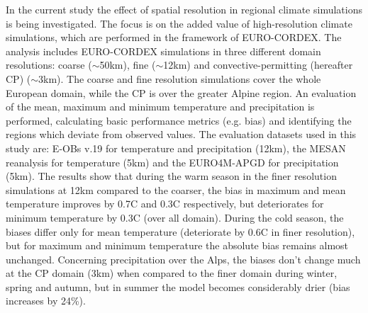 \documentclass[greek,12pt]{report}
\begin{document}
In the current study the effect of spatial resolution in regional climate simulations is being investigated. The focus is on the added value of high-resolution climate simulations, which are performed in the framework of EURO-CORDEX. The analysis includes EURO-CORDEX simulations in three different domain resolutions: coarse ($\sim$50km), fine ($\sim$12km) and convective-permitting (hereafter CP) ($\sim$3km). The coarse and fine resolution simulations cover the whole European domain, while the CP is over the greater Alpine region. An evaluation of the mean, maximum and minimum temperature and precipitation is performed, calculating basic performance metrics (e.g. bias) and identifying the regions which deviate from observed values. The evaluation datasets used in this study are: E-OBs v.19 for temperature and precipitation (12km), the MESAN reanalysis for temperature (5km) and the EURO4M-APGD for precipitation (5km). The results show that during the warm season in the finer resolution simulations at 12km compared to the coarser, the bias in maximum and mean temperature improves by 0.7\degree C and 0.3\degree C respectively, but deteriorates for minimum temperature by 0.3\degree C (over all domain). During the cold season, the biases differ only for mean temperature (deteriorate by 0.6\degree C in finer resolution), but for maximum and minimum temperature the absolute bias remains almost unchanged. Concerning precipitation over the Alps, the biases don't change much at the CP domain (3km) when compared to the finer domain during winter, spring and autumn, but in summer the model becomes considerably drier (bias increases by 24\%).
\end{document}
